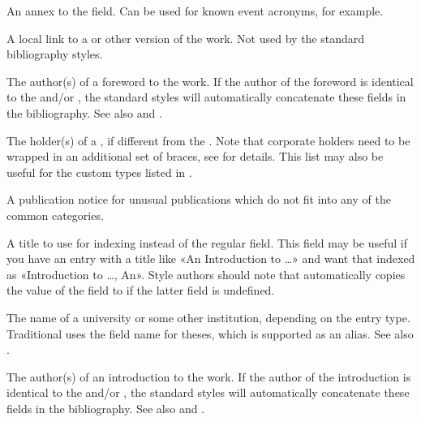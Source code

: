 \documentclass{ltxdockit}[2011/03/25]
\newcommand*{\biblatex}{\sty{biblatex}\xspace}
\begin{document}
\begin{fieldlist}

An annex to the  field. Can be used for known event acronyms, for example.


A local link to a  or other version of the work. Not used by the standard bibliography styles.


The author(s) of a foreword to the work. If the author of the foreword is identical to the  and\slash or , the standard styles will automatically concatenate these fields in the bibliography. See also  and .


The holder(s) of a , if different from the . Note that corporate holders need to be wrapped in an additional set of braces, see  for details. This list may also be useful for the custom types listed in .


A publication notice for unusual publications which do not fit into any of the common categories.


A title to use for indexing instead of the regular  field. This field may be useful if you have an entry with a title like «An Introduction to \dots» and want that indexed as «Introduction to \dots, An». Style authors should note that \biblatex automatically copies the value of the  field to  if the latter field is undefined.


The name of a university or some other institution, depending on the entry type. Traditional \bibtex uses the field name  for theses, which is supported as an alias. See also .


The author(s) of an introduction to the work. If the author of the introduction is identical to the  and\slash or , the standard styles will automatically concatenate these fields in the bibliography. See also  and .


\end{fieldlist}
\end{document}

